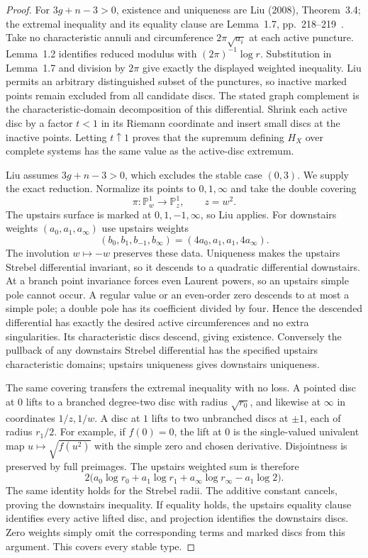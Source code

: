 \begin{proof}
For $3g+n-3>0$, existence and uniqueness are Liu (2008), Theorem~3.4; the extremal inequality and its equality clause are Lemma~1.7, pp.~218--219~\cite{C_Liu2008}. Take no characteristic annuli and circumference $2\pi\sqrt{a_i}$ at each active puncture. Lemma~1.2 identifies reduced modulus with $(2\pi)^{-1}\log r$. Substitution in Lemma~1.7 and division by $2\pi$ give exactly the displayed weighted inequality. Liu permits an arbitrary distinguished subset of the punctures, so inactive marked points remain excluded from all candidate discs. The stated graph complement is the characteristic-domain decomposition of this differential. Shrink each active disc by a factor $t<1$ in its Riemann coordinate and insert small discs at the inactive points. Letting $t\uparrow1$ proves that the supremum defining $H_X$ over complete systems has the same value as the active-disc extremum.

Liu assumes $3g+n-3>0$, which excludes the stable case $(0,3)$. We supply the exact reduction. Normalize its points to $0,1,\infty$ and take the double covering
\[
 \pi:\mathbb P^1_w\longrightarrow\mathbb P^1_z,\qquad z=w^2.
\]
The upstairs surface is marked at $0,1,-1,\infty$, so Liu applies. For downstairs weights $(a_0,a_1,a_\infty)$ use upstairs weights
\[
 (b_0,b_1,b_{-1},b_\infty)=(4a_0,a_1,a_1,4a_\infty).
\]
The involution $w\mapsto-w$ preserves these data. Uniqueness makes the upstairs Strebel differential invariant, so it descends to a quadratic differential downstairs. At a branch point invariance forces even Laurent powers, so an upstairs simple pole cannot occur. A regular value or an even-order zero descends to at most a simple pole; a double pole has its coefficient divided by four. Hence the descended differential has exactly the desired active circumferences and no extra singularities. Its characteristic discs descend, giving existence. Conversely the pullback of any downstairs Strebel differential has the specified upstairs characteristic domains; upstairs uniqueness gives downstairs uniqueness.

The same covering transfers the extremal inequality with no loss. A pointed disc at $0$ lifts to a branched degree-two disc with radius $\sqrt{r_0}$, and likewise at $\infty$ in coordinates $1/z,1/w$. A disc at $1$ lifts to two unbranched discs at $\pm1$, each of radius $r_1/2$. For example, if $f(0)=0$, the lift at $0$ is the single-valued univalent map $u\mapsto\sqrt{f(u^2)}$ with the simple zero and chosen derivative. Disjointness is preserved by full preimages. The upstairs weighted sum is therefore
\[
 2\bigl(a_0\log r_0+a_1\log r_1+a_\infty\log r_\infty-a_1\log2\bigr).
\]
The same identity holds for the Strebel radii. The additive constant cancels, proving the downstairs inequality. If equality holds, the upstairs equality clause identifies every active lifted disc, and projection identifies the downstairs discs. Zero weights simply omit the corresponding terms and marked discs from this argument. This covers every stable type.


\end{proof}

